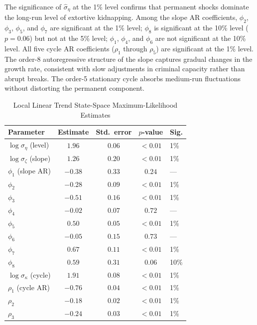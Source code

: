 \documentclass[12pt]{article}
\numberwithin{equation}{section}
\numberwithin{table}{section}
\theoremstyle{definition}
\begin{document}
The significance of $\hat\sigma_\eta$ at the 1\% level confirms that
permanent shocks dominate the long-run level of extortive kidnapping. Among
the slope AR coefficients, $\phi_2$, $\phi_3$, $\phi_5$, and $\phi_7$ are
significant at the 1\% level; $\phi_8$ is significant at the 10\% level
($p=0.06$) but not at the 5\% level; $\phi_1$, $\phi_4$, and $\phi_6$ are not
significant at the 10\% level. All five cycle AR coefficients ($\rho_1$
through $\rho_5$) are significant at the 1\% level. The order-8
autoregressive structure of the slope captures gradual changes in the growth
rate, consistent with slow adjustments in criminal capacity rather than
abrupt breaks. The order-5 stationary cycle absorbs medium-run fluctuations
without distorting the permanent component.

\begin{table}[t]
\centering
\caption{Local Linear Trend State-Space Maximum-Likelihood Estimates}
\label{tab:llt}
\begin{tabular}{lcccl}
\toprule
Parameter & Estimate & Std.\ error & $p$-value & Sig. \\
\midrule
$\log\sigma_\eta$ (level)      & $1.96$  & $0.06$ & $<0.01$ & 1\% \\
$\log\sigma_\zeta$ (slope)     & $1.26$  & $0.20$ & $<0.01$ & 1\% \\
$\phi_1$ (slope AR)            & $-0.38$ & $0.33$ & $0.24$  & --- \\
$\phi_2$                       & $-0.28$ & $0.09$ & $<0.01$ & 1\% \\
$\phi_3$                       & $-0.51$ & $0.16$ & $<0.01$ & 1\% \\
$\phi_4$                       & $-0.02$ & $0.07$ & $0.72$  & --- \\
$\phi_5$                       & $0.50$  & $0.05$ & $<0.01$ & 1\% \\
$\phi_6$                       & $-0.05$ & $0.15$ & $0.73$  & --- \\
$\phi_7$                       & $0.67$  & $0.11$ & $<0.01$ & 1\% \\
$\phi_8$                       & $0.59$  & $0.31$ & $0.06$  & 10\% \\
$\log\sigma_\kappa$ (cycle)    & $1.91$  & $0.08$ & $<0.01$ & 1\% \\
$\rho_1$ (cycle AR)            & $-0.76$ & $0.04$ & $<0.01$ & 1\% \\
$\rho_2$                       & $-0.18$ & $0.02$ & $<0.01$ & 1\% \\
$\rho_3$                       & $-0.24$ & $0.03$ & $<0.01$ & 1\% \\

\end{tabular}
\end{table}
\end{document}
